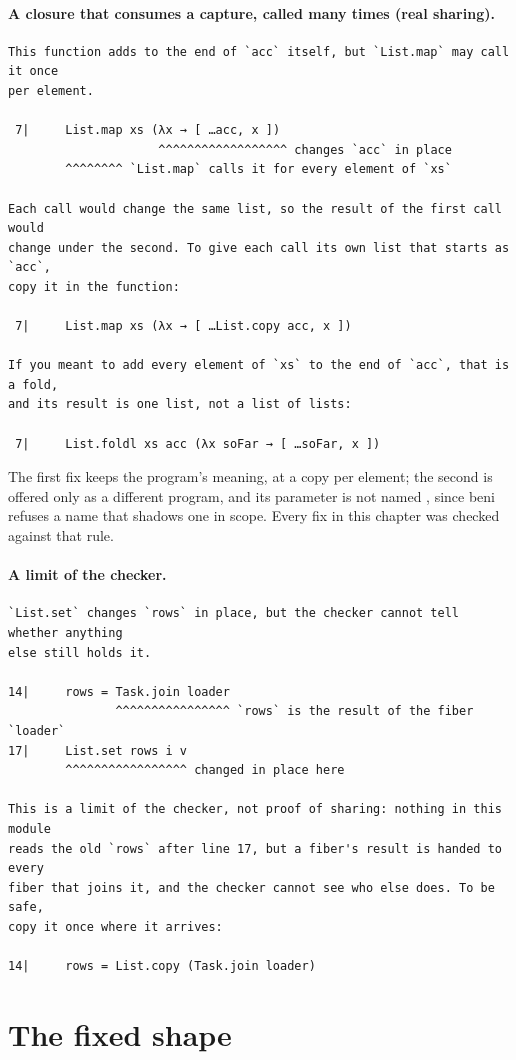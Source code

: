 \paragraph{A closure that consumes a capture, called many times (real sharing).}
\begin{Verbatim}
This function adds to the end of `acc` itself, but `List.map` may call it once
per element.

 7|     List.map xs (λx → [ …acc, x ])
                     ^^^^^^^^^^^^^^^^^^ changes `acc` in place
        ^^^^^^^^ `List.map` calls it for every element of `xs`

Each call would change the same list, so the result of the first call would
change under the second. To give each call its own list that starts as `acc`,
copy it in the function:

 7|     List.map xs (λx → [ …List.copy acc, x ])

If you meant to add every element of `xs` to the end of `acc`, that is a fold,
and its result is one list, not a list of lists:

 7|     List.foldl xs acc (λx soFar → [ …soFar, x ])
\end{Verbatim}
The first fix keeps the program's meaning, at a copy per element; the second is offered only as a
different program, and its parameter is not named , since beni refuses a name that shadows one in
scope. Every fix in this chapter was checked against that rule.

\paragraph{A limit of the checker.}
\begin{Verbatim}
`List.set` changes `rows` in place, but the checker cannot tell whether anything
else still holds it.

14|     rows = Task.join loader
               ^^^^^^^^^^^^^^^^ `rows` is the result of the fiber `loader`
17|     List.set rows i v
        ^^^^^^^^^^^^^^^^^ changed in place here

This is a limit of the checker, not proof of sharing: nothing in this module
reads the old `rows` after line 17, but a fiber's result is handed to every
fiber that joins it, and the checker cannot see who else does. To be safe,
copy it once where it arrives:

14|     rows = List.copy (Task.join loader)
\end{Verbatim}

\section{The fixed shape}
\label{sec:errors-shape}

